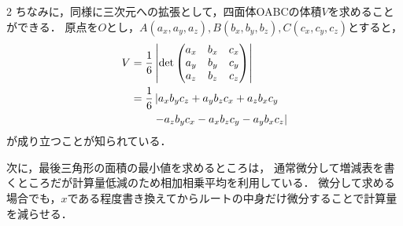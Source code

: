 \documentclass[../../main.tex]{subfiles}
\begin{document}
\begin{multicols}{2}
  ちなみに，同様に三次元への拡張として，四面体OABCの体積$V$を求めることができる．
  原点を$O$とし，$A(a_x,a_y,a_z), B(b_x,b_y,b_z), C(c_x,c_y,c_z)$とすると，
  \begin{align}
    V
    & = \dfrac{1}{6}\left|\det \mqty(a_x                                                               & b_x & c_x \\ a_y & b_y & c_y \\ a_z & b_z & c_z) \right| \\
    & = \dfrac{1}{6}\left|a_xb_yc_z + a_yb_zc_x + a_zb_xc_y \right.  \nonumber \\
    & \quad \quad \left. - a_zb_yc_x - a_xb_zc_y - a_yb_xc_z\right|
  \end{align}
  が成り立つことが知られている．

  次に，最後三角形の面積の最小値を求めるところは，
  通常微分して増減表を書くところだが計算量低減のため相加相乗平均を利用している．
  微分して求める場合でも，$x$である程度書き換えてからルートの中身だけ微分することで計算量を減らせる．

  \newpage
\end{multicols}
\end{document}

